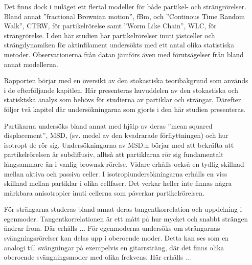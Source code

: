 Det finns dock i nuläget ett flertal modeller för både partikel- och strängrörelser. Bland annat ''fractional Brownian motion'', fBm, 
\cite{Mandelbrot_fBm1968} och ''Continous Time Random Walk'', CTRW, 
\cite{Hofling&Franosch2013} för partikelrörelse samt ''Worm Like Chain'', WLC, 
\cite{Milstein2013} för strängrörelse. %
I den här studien har partikelrörelser inuti jästceller och strängdynamiken för aktinfilament undersökts med ett antal olika statistiska metoder. Observationerna från datan jämförs även med förutsägelser från bland annat modellerna.

Rapporten börjar med en översikt av den stokastiska teoribakgrund som används i de efterföljande kapitlen. 
Här presenteras huvuddelen av den stokastiska och statisktska analys som behövs för studierna av partiklar och strängar. Därefter följer två kapitel där undersökningarna som gjorts i den här studien presenteras.

Partikarna undersöks bland annat med hjälp av deras ''mean squared displacement'', MSD, (sv. medel av den kvadrarade förflyttningen) och hur isotropt de rör sig.
Undersökningarna av MSD:n börjar med att bekräfta att partikelrörelsen är subdiffusiv\cite{Hofling&Franosch2013}, alltså att partiklarna rör sig fundamentalt långsammare än i vanlig brownsk rörelse. Vidare erhålls också en tydlig skillnad mellan aktiva och passiva celler. 
I isotropiundersökningarna erhålls en viss skillnad mellan partiklar i olika cellfaser. Det verkar heller inte finnas några märkbara anisotropier inuti cellerna som påverkar partikelrörelsen. 

För strängarna studeras bland annat deras tangentkorrelation och uppdelning i egenmoder. 
Tangentkorrelationen är ett mått på hur mycket och snabbt strängen ändrar from. Där erhålls ...
För egenmoderna undersöks om strängarnas svängningsrörelser kan delas upp i oberoende moder. Detta kan ses som en analogi till svängningar på exempelvis en gitarrsträng, där det finns olika oberoende svängningsmoder med olika frekvens. Här erhålls ...




